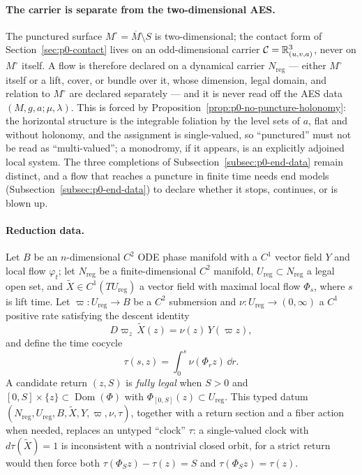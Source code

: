 \paragraph{The carrier is separate from the two-dimensional AES.}  The punctured
surface $M^\circ=\overline M\setminus S$ is two-dimensional; the contact form of
Section~\ref{sec:p0-contact} lives on an odd-dimensional carrier
$\mathcal C=\mathbb{R}^3_{(u,v,a)}$, never on $M^\circ$ itself.  A flow is therefore declared on a
dynamical carrier $N_{\mathrm{reg}}$ --- either $M^\circ$ itself or a lift,
cover, or bundle over it, whose dimension, legal domain, and relation to
$M^\circ$ are declared separately --- and it is never read off the AES data
$(M,g,a;\mu,\lambda)$.  This is forced by
Proposition~\ref{prop:p0-no-puncture-holonomy}: the horizontal structure is the
integrable foliation by the level sets of $a$, flat and without holonomy, and the
assignment is single-valued, so ``punctured'' must not be read as
``multi-valued''; a monodromy, if it appears, is an explicitly adjoined local
system.  The three completions of Subsection~\ref{subsec:p0-end-data} remain
distinct, and a flow that reaches a puncture in finite time needs end models
(Subsection~\ref{subsec:p0-end-data}) to declare whether it stops, continues, or
is blown up.

\paragraph{Reduction data.}  Let $B$ be an $n$-dimensional $C^2$ ODE phase
manifold with a $C^1$ vector field $Y$ and local flow $\varphi_t$; let
$N_{\mathrm{reg}}$ be a finite-dimensional $C^2$ manifold,
$U_{\mathrm{reg}}\subset N_{\mathrm{reg}}$ a legal open set, and
$\widetilde X\in C^1(TU_{\mathrm{reg}})$ a vector field with maximal local flow
$\Phi_s$, where $s$ is lift time.  Let $\varpi\colon U_{\mathrm{reg}}\to B$ be a
$C^2$ submersion and $\nu\colon U_{\mathrm{reg}}\to(0,\infty)$ a $C^1$ positive
rate satisfying the descent identity
\[
  D\varpi_z\,\widetilde X(z)=\nu(z)\,Y(\varpi z),
\]
and define the time cocycle
\[
  \tau(s,z)=\int_0^s \nu(\Phi_r z)\,\dd r .
\]
A candidate return $(z,S)$ is \emph{fully legal} when $S>0$ and
$[0,S]\times\{z\}\subset\operatorname{Dom}(\Phi)$ with
$\Phi_{[0,S]}(z)\subset U_{\mathrm{reg}}$.  This typed datum
$(N_{\mathrm{reg}},U_{\mathrm{reg}},B,\widetilde X,Y,\varpi,\nu,\tau)$, together with
a return section and a fiber action when needed, replaces an untyped
``clock'' $\tau$: a single-valued clock with $d\tau(\widetilde X)=1$ is
inconsistent with a nontrivial closed orbit, for a strict return would then force
both $\tau(\Phi_S z)-\tau(z)=S$ and $\tau(\Phi_S z)=\tau(z)$.

